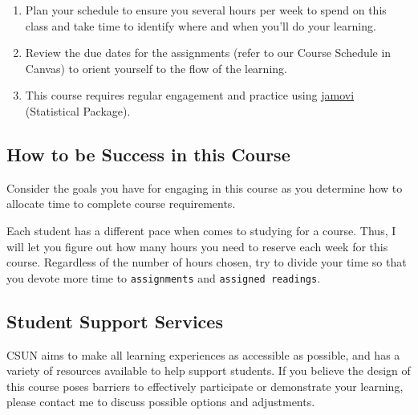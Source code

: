 \documentclass[
  letterpaper,
  DIV=11,
  numbers=noendperiod]{scrartcl}
\providecommand{\tightlist}{%
  \setlength{\itemsep}{0pt}\setlength{\parskip}{0pt}}\usepackage{longtable,booktabs,array}
\begin{document}
\begin{enumerate}
\def\labelenumi{\arabic{enumi}.}
\tightlist
\item
  Plan your schedule to ensure you several hours per week to spend on
  this class and take time to identify where and when you'll do your
  learning.
\item
  Review the due dates for the assignments (refer to our Course Schedule
  in Canvas) to orient yourself to the flow of the learning.
\item
  This course requires regular engagement and practice using
  \protect\hyperlink{instructional-resources}{jamovi} (Statistical
  Package).
\end{enumerate}

\hypertarget{sec-success}{%
\subsection{How to be Success in this Course}\label{sec-success}}

Consider the goals you have for engaging in this course as you determine
how to allocate time to complete course requirements.

Each student has a different pace when comes to studying for a course.
Thus, I will let you figure out how many hours you need to reserve each
week for this course. Regardless of the number of hours chosen, try to
divide your time so that you devote more time to \texttt{assignments}
and \texttt{assigned\ readings}.

\hypertarget{sec-student-support-services}{%
\subsection{Student Support
Services}\label{sec-student-support-services}}

CSUN aims to make all learning experiences as accessible as possible,
and has a variety of resources available to help support students. If
you believe the design of this course poses barriers to effectively
participate or demonstrate your learning, please contact me to discuss
possible options and adjustments.
\end{document}
